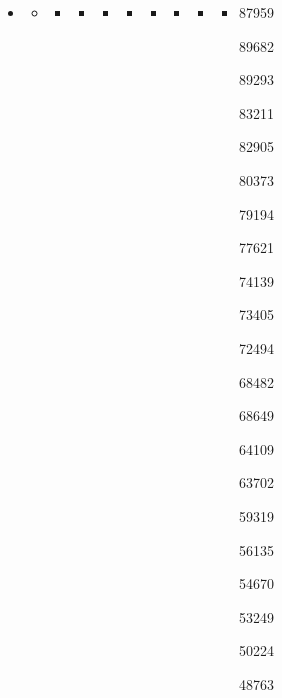 \documentclass[
]{book}
\begin{document}
\begin{itemize}
\item
  \begin{itemize}
  \item
    \begin{itemize}
    \item
      \begin{itemize}
      \item
        \begin{itemize}
        \item
          \begin{itemize}
          \item
            \begin{itemize}
            \item
              \begin{itemize}
              \item
                \begin{itemize}
                \item
                  \begin{itemize}
                  \item
                    87959

                    89682

                    89293

                    83211

                    82905

                    80373

                    79194

                    77621

                    74139

                    73405

                    72494

                    68482

                    68649

                    64109

                    63702

                    59319

                    56135

                    54670

                    53249

                    50224

                    48763


\end{itemize}
\end{itemize}
\end{itemize}
\end{itemize}
\end{itemize}
\end{itemize}
\end{itemize}
\end{itemize}
\end{itemize}
\end{itemize}
\end{document}
